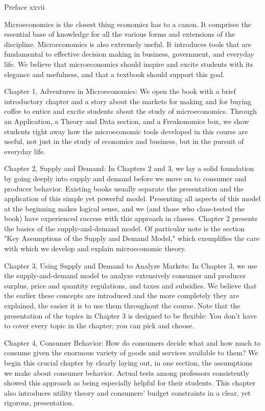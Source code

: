Preface xxvii

Microeconomics is the closest thing economics has to a canon. It comprises the essential base of knowledge for all the various forms and extensions of the discipline. Microeconomics is also extremely useful. It introduces tools that are fundamental to effective decision making in business, government, and everyday life. We believe that microeconomics should inspire and excite students with its elegance and usefulness, and that a textbook should support this goal.

Chapter 1, Adventures in Microeconomics: We open the book with a brief introductory chapter and a story about the markets for making and for buying coffee to entice and excite students about the study of microeconomics. Through an Application, a Theory and Data section, and a Freakonomics box, we show students right away how the microeconomic tools developed in this course are useful, not just in the study of economics and business, but in the pursuit of everyday life.

Chapter 2, Supply and Demand: In Chapters 2 and 3, we lay a solid foundation by going deeply into supply and demand before we move on to consumer and producer behavior. Existing books usually separate the presentation and the application of this simple yet powerful model. Presenting all aspects of this model at the beginning makes logical sense, and we (and those who class-tested the book) have experienced success with this approach in classes. Chapter 2 presents the basics of the supply-and-demand model. Of particular note is the section "Key Assumptions of the Supply and Demand Model," which exemplifies the care with which we develop and explain microeconomic theory.

Chapter 3, Using Supply and Demand to Analyze Markets: In Chapter 3, we use the supply-and-demand model to analyze extensively consumer and producer surplus, price and quantity regulations, and taxes and subsidies. We believe that the earlier these concepts are introduced and the more completely they are explained, the easier it is to use them throughout the course. Note that the presentation of the topics in Chapter 3 is designed to be flexible: You don't have to cover every topic in the chapter; you can pick and choose.

Chapter 4, Consumer Behavior: How do consumers decide what and how much to consume given the enormous variety of goods and services available to them? We begin this crucial chapter by clearly laying out, in one section, the assumptions we make about consumer behavior. Actual tests among professors consistently showed this approach as being especially helpful for their students. This chapter also introduces utility theory and consumers' budget constraints in a clear, yet rigorous, presentation.

